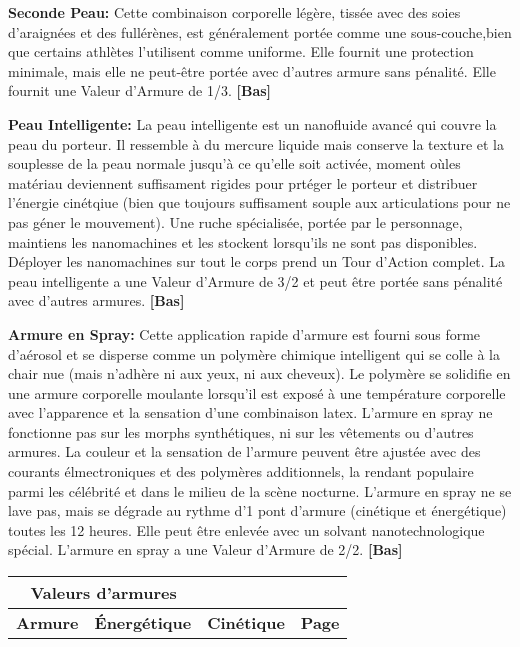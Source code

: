 {{\textbf{Seconde Peau:} Cette combinaison corporelle légère, tissée avec des soies d'araignées et des fullérènes, est généralement portée comme une sous-couche,bien que certains athlètes l'utilisent comme uniforme. Elle fournit une protection minimale, mais elle ne peut-être portée avec d'autres armure sans pénalité. Elle fournit une Valeur d'Armure de 1/3. \textbf{[Bas]} 

\textbf{Peau Intelligente:} La peau intelligente est un nanofluide avancé qui couvre la peau du porteur. Il ressemble à du mercure liquide mais conserve la texture et la souplesse de la peau normale jusqu'à ce qu'elle soit activée, moment oùles matériau deviennent suffisament rigides pour prtéger le porteur et distribuer l'énergie cinétqiue (bien que toujours suffisament souple aux articulations pour ne pas géner le mouvement). Une ruche spécialisée, portée par le personnage, maintiens les nanomachines et les stockent lorsqu'ils ne sont pas disponibles. Déployer les nanomachines sur tout le corps prend un Tour d'Action complet. La peau intelligente a une Valeur d'Armure de 3/2 et peut être portée sans pénalité avec d'autres armures. \textbf{[Bas]} 

\textbf{Armure en Spray:} Cette application rapide d'armure est fourni sous forme d'aérosol et se disperse comme un polymère chimique intelligent qui se colle à la chair nue (mais n'adhère ni aux yeux, ni aux cheveux). Le polymère se solidifie en une armure corporelle moulante lorsqu'il est exposé à une température corporelle avec l'apparence et la sensation d'une combinaison latex. L'armure en spray ne fonctionne pas sur les morphs synthétiques, ni sur les vêtements ou d'autres armures. La couleur et la sensation de l'armure peuvent être ajustée avec des courants élmectroniques et des polymères additionnels, la rendant populaire parmi les célébrité et dans le milieu de la scène nocturne. L'armure en spray ne se lave pas, mais se dégrade au rythme d'1 pont d'armure (cinétique et énergétique) toutes les 12 heures. Elle peut être enlevée avec un solvant nanotechnologique spécial. L'armure en spray a une Valeur d'Armure de 2/2. \textbf{[Bas]} 

\begin{table} \begin{tabular}{|l|l|l|l|} \hline

\multicolumn{2}{|c|}{\textbf{Valeurs d'armures}}	\\ \hline

\textbf{Armure}	&\textbf{Énergétique} &\textbf{Cinétique}	&\textbf{Page} \\ \hline


\end{tabular}
\end{table}}}
